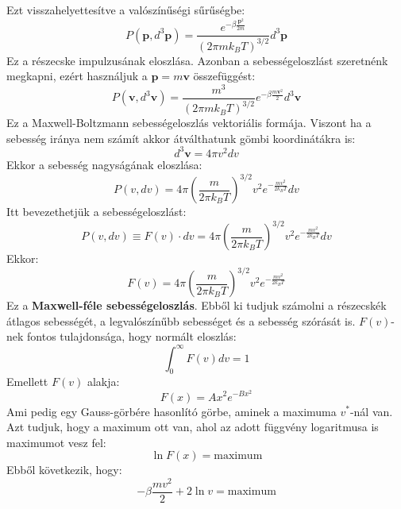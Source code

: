 \documentclass[../main.tex]{subfiles}
\begin{document}
Ezt visszahelyettesítve a valószínűségi sűrűségbe:
\begin{equation}
    P(\mathbf{p}, d^3 \mathbf{p}) = \frac{e^{-\beta \frac{\mathbf{p}^2}{2m}}}{(2 \pi m k_B T)^{3/2}} d^3 \mathbf{p}
\end{equation}
Ez a részecske impulzusának eloszlása. Azonban a sebességeloszlást szeretnénk megkapni, ezért használjuk a $\mathbf{p} = m \mathbf{v}$ összefüggést:
\begin{equation}
    P(\mathbf{v}, d^3 \mathbf{v}) = \frac{m^3}{(2 \pi m k_B T)^{3/2}} e^{-\beta \frac{m \mathbf{v}^2}{2}} d^3 \mathbf{v}
\end{equation}
Ez a Maxwell-Boltzmann sebességeloszlás vektoriális formája. Viszont ha a sebesség iránya nem számít akkor átválthatunk gömbi koordinátákra is:
\begin{equation}
    d^3 \mathbf{v} = 4 \pi v^2 dv
\end{equation}
Ekkor a sebesség nagyságának eloszlása:
\begin{equation}
    P(v, dv) = 4 \pi \left( \frac{m}{2 \pi k_B T} \right)^{3/2} v^2 e^{-\frac{m v^2}{2 k_B T}} dv
\end{equation}
Itt bevezethetjük a sebességeloszlást:
\begin{equation}
    P(v, dv) \equiv F(v) \cdot dv = 4 \pi \left( \frac{m}{2 \pi k_B T} \right)^{3/2} v^2 e^{-\frac{m v^2}{2 k_B T}} dv
\end{equation}
Ekkor:
\begin{equation}
    \boxed{F(v) = 4 \pi \left( \frac{m}{2 \pi k_B T} \right)^{3/2} v^2 e^{-\frac{m v^2}{2 k_B T}}}
\end{equation}
Ez a \textbf{Maxwell-féle sebességeloszlás}. Ebből ki tudjuk számolni a részecskék átlagos sebességét, a legvalószínűbb sebességet és a sebesség szórását is.
$F(v)$-nek fontos tulajdonsága, hogy normált eloszlás:
\begin{equation}
    \int_0^{\infty} F(v) dv = 1
\end{equation}
Emellett $F(v)$ alakja:
\begin{equation}
    F(x) = A x^2 e^{-B x^2}
\end{equation}
Ami pedig egy Gauss-görbére hasonlító görbe, aminek a maximuma $v^{*}$-nál van. Azt tudjuk, hogy a maximum ott van, ahol az adott függvény logaritmusa is maximumot vesz fel:
\begin{equation}
    \ln F(x) = \text{maximum}
\end{equation}
Ebből következik, hogy:
\begin{equation}
    - \beta \frac{m v^2}{2} + 2 \ln v = \text{maximum}
\end{equation}
\end{document}
